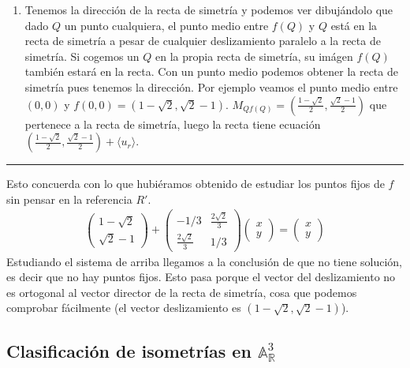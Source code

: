 \documentclass[14pt]{book}
\begin{document}
\begin{ej}
\begin{enumerate}
		\item Tenemos la dirección de la recta de simetría y podemos ver dibujándolo que dado $Q$ un punto cualquiera, el punto medio entre $f(Q)$ y $Q$ está en la recta de simetría a pesar de cualquier deslizamiento paralelo a la recta de simetría. Si cogemos un $Q$ en la propia recta de simetría, su imágen $f(Q)$ también estará en la recta. Con un punto medio podemos obtener la recta de simetría pues tenemos la dirección. Por ejemplo veamos el punto medio entre $(0,0)$ y $f(0,0) = (1 - \sqrt{2}, \sqrt{2} - 1)$. $M_{Qf(Q)} = (\frac{1 - \sqrt{2}}{2}, \frac{\sqrt{2} - 1}{2})$ que pertenece a la recta de simetría, luego la recta tiene ecuación $(\frac{1 - \sqrt{2}}{2}, \frac{\sqrt{2} - 1}{2}) + \langle u_r\rangle $.
	\end{enumerate}
	
	\hrule
	Esto concuerda con lo que hubiéramos obtenido de estudiar los puntos fijos de $f$ sin pensar en la referencia $R'$.
	\begin{align*}
	\left(\begin{array}{c}
	1 - \sqrt{2} \\ \sqrt{2} - 1
	\end{array}\right) + \left(\begin{array}{cc}
	-1/3 & \frac{2\sqrt{2}}{3} \\
	\frac{2\sqrt{2}}{3} & 1/3
	\end{array}\right)\left(\begin{array}{c}
	x \\ y
	\end{array}\right) = 
	\left(\begin{array}{c}
	x \\ y
	\end{array}\right)
	\end{align*}
	Estudiando el sistema de arriba llegamos a la conclusión de que no tiene solución, es decir que no hay puntos fijos. Esto pasa porque el vector del deslizamiento no es ortogonal al vector director de la recta de simetría, cosa que podemos comprobar fácilmente (el vector deslizamiento es $(1 - \sqrt{2}, \sqrt{2} - 1)$).
\end{ej}

\subsection{Clasificación de isometrías en $\mathbb{A}_\mathbb{R}^3$}
\end{document}
